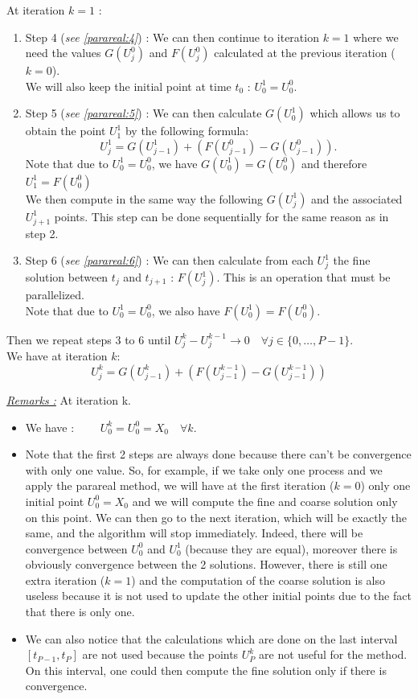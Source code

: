 \noindent At iteration $k=1$ :
\begin{enumerate}[label=\textbullet]	
	\item Step 4 (\textit{see \ref{parareal:4}}) : We can then continue to iteration $k=1$ where we need the values $G(U_j^0)$ and $F(U_j^0)$ calculated at the previous iteration ($k=0$). \\
	We will also keep the initial point at time $t_0$ : $U_0^1=U_0^0$.
	\item Step 5 (\textit{see \ref{parareal:5}}) : We can then calculate $G(U_0^1)$ which allows us to obtain the point $U_1^1$ by the following formula:
	$$U_j^1=G(U_{j-1}^1)+(F(U_{j-1}^0)-G(U_{j-1}^0)).$$
	Note that due to $U_0^1=U_0^0$, we have $G(U_0^1)=G(U_0^0)$ and therefore $U_1^1=F(U_0^0)$ \\
	We then compute in the same way the following $G(U_j^1)$ and the associated $U_{j+1}^1$ points. This step can be done sequentially for the same reason as in step 2.
	\item Step 6 (\textit{see \ref{parareal:6}}) : We can then calculate from each $U_j^1$ the fine solution between $t_j$ and $t_{j+1}$ : $F(U_j^1)$. This is an operation that must be parallelized. \\
	Note that due to $U_0^1=U_0^0$, we also have $F(U_0^1)=F(U_0^0)$.
\end{enumerate}

\noindent Then we repeat steps 3 to 6 until $U_j^k-U_j^{k-1}\rightarrow 0 \quad \forall j\in\{0,\dots,P-1\}$. \\
We have at iteration $k$:
$$U_j^k=G(U_{j-1}^k)+(F(U_{j-1}^{k-1})-G(U_{j-1}^{k-1}))$$

\noindent \underline{\textit{Remarks :}} At iteration k.
\begin{itemize}[label=-]
	\item We have : $\qquad U_0^k=U_0^0=X_0 \quad \forall k$.
	\item Note that the first 2 steps are always done because there can't be convergence with only one value. So, for example, if we take only one process and we apply the parareal method, we will have at the first iteration ($k=0$) only one initial point $U_0^0=X_0$ and we will compute the fine and coarse solution only on this point. We can then go to the next iteration, which will be exactly the same, and the algorithm will stop immediately. Indeed, there will be convergence between $U_0^0$ and $U_0^1$ (because they are equal), moreover there is obviously convergence between the 2 solutions. However, there is still one extra iteration ($k=1$) and the computation of the coarse solution is also useless because it is not used to update the other initial points due to the fact that there is only one.
	\item We can also notice that the calculations which are done on the last interval $[t_{P-1},t_P]$ are not used because the points $U_P^k$ are not useful for the method. On this interval, one could then compute the fine solution only if there is convergence.
\end{itemize}

